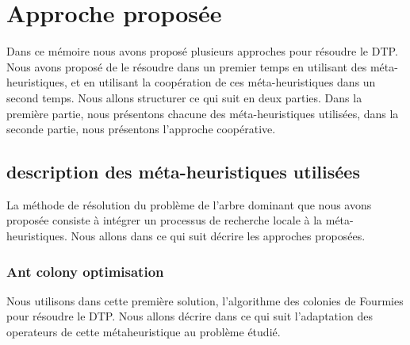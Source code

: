 \section{Approche proposée}
Dans ce mémoire nous avons proposé plusieurs approches pour résoudre le DTP. Nous avons proposé de le résoudre dans un premier temps en utilisant des méta-heuristiques, et en utilisant la coopération de ces méta-heuristiques dans un second temps. Nous allons structurer ce qui suit en deux parties. Dans la première partie, nous présentons chacune des méta-heuristiques utilisées, dans la seconde partie, nous présentons l'approche coopérative.


\subsection{description des méta-heuristiques utilisées}
La méthode de résolution du problème de l’arbre dominant que nous avons proposée consiste à intégrer un processus de recherche locale  à la méta-heuristiques. Nous allons dans ce qui suit décrire les approches proposées. 

\subsubsection{Ant colony optimisation}
Nous utilisons dans cette première solution, l'algorithme des colonies de Fourmies pour résoudre le DTP. Nous allons décrire dans ce qui suit l'adaptation des operateurs de  cette métaheuristique au problème étudié. 

